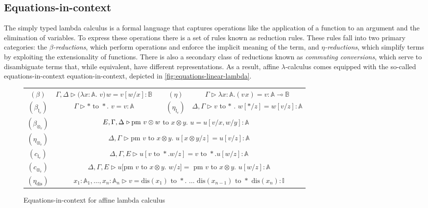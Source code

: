 \subsection{Equations-in-context}
The simply typed lambda calculus is a formal language that captures operations like the application of a function to an argument and the elimination of variables. To express these operations there is a set of rules known as reduction rules. These rules fall into two primary categories: the $\beta$\emph{-reductions}, which perform operations and enforce the implicit meaning of the term, and $\eta$\emph{-reductions}, which simplify terms by exploiting the extensionality of functions. 
There is also a secondary class of reductions known as \emph{commuting conversions}, which serve to disambiguate terms that, while equivalent, have different representations.
As a result, affine $\lambda$-calculus comes equipped with the so-called equations-in-context \gls{equation-in-context}, depicted in \autoref{fig:equations-linear-lambda}.
\begin{figure}[H]
  \centering
  \begin{tabular}{ |ccccc| }
    \hline
$(\beta)$ &  $\Gamma, \Delta \triangleright (\lambda x : \mathbb{A}.$ $v) \hspace{1pt}  w = v[w/x]: \mathbb{B} $ & &$(\eta)$ &  $\Gamma  \triangleright \lambda x : \mathbb{A} .(v \hspace{1pt} x) = v: \mathbb{A} \multimap \mathbb{B} $ \\
$(\beta_{\mathbb{I}_{e}})$ &   $ \Gamma \triangleright * \text { to } *.$ $v = v:\mathbb{A}$ && $(\eta_{\mathbb{I}_{e}})$ & $ \Delta, \Gamma \triangleright v$ to $*$ . $w[* / z] = w[v / z]: \mathbb{A}$  \\
$(\beta_{\otimes_{e}})$   &\multicolumn{4}{c|}{$ \hspace{-10pt}  E, \Gamma, \Delta \hspace{1pt}\triangleright \text{pm } v \otimes w$ to $x \otimes y.$ $u = u[v/x,w/y]:\mathbb{A}$ }\\
$(\eta_{\otimes_{e}})$   &\multicolumn{4}{c|}{$\Delta , \Gamma\hspace{1pt}\triangleright \text{pm } v$ to $x \otimes y.$ $u[x \otimes y/z] = u[v/z] :\mathbb{A} $}\\
 $(c_{\mathbb{I}_{e}})$  &\multicolumn{4}{c|}{ $\Delta,\Gamma, E \triangleright u[v \text{ to } \ast . w/z] = v \text{ to } \ast . u[w/z]:\mathbb{A}$ }\\
$(c_{\otimes_{e}})$ & \multicolumn{4}{c|}{ $\Delta,\Gamma, E  \triangleright u[$pm $v$ to $x \otimes y.$ $w/z] =$ pm $v$ to $x \otimes y.$ $u[w/z]: \mathbb{A} $ }\\
$(\eta_{\text{dis}})$ & \multicolumn{4}{c|}{ $x_1:\mathbb{A}_1, \ldots,x_n:\mathbb{A}_n\triangleright v = \text{dis}(x_1) \text{ to } \ast.$ $\ldots$ $\text{dis}(x_{n-1}) \text{ to } \ast \text{ dis}(x_{n}): \mathbb{ I}$ }\\
\hline
  \end{tabular}
\caption{Equations-in-context for affine lambda calculus}
\label{fig:equations-linear-lambda}
\end{figure}

